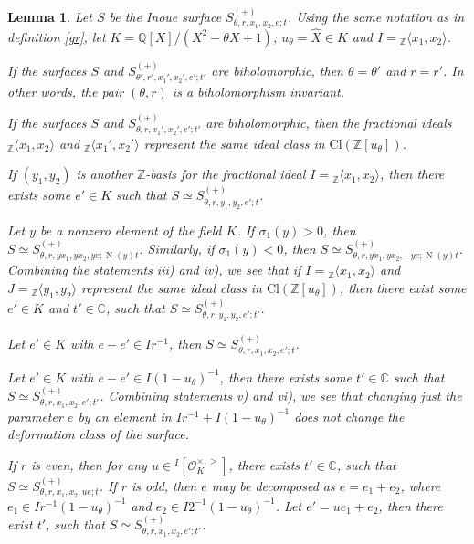 \documentclass[12pt]{amsart}
\newtheorem{lemma}{Lemma}[section]
\newcommand{\Z}{\mathbb{Z}}
\newcommand{\C}{\mathbb{C}}
\newcommand{\Q}{\mathbb{Q}}
\newcommand{\OO}{\mathcal{O}}
\DeclareMathOperator{\Norm}{N}
\begin{document}
\begin{lemma}\label{Sym}
Let $S$ be the Inoue surface $S_{\theta, r, x_1,x_2,e;t}^{(+)}$. Using the same notation as in definition \ref{gr}, let $K = \Q[X]/(X^2-\theta X + 1)$; $u_\theta = \hat{X} \in K$ and $I = {}_\Z\langle x_1, x_2\rangle$.
\begin{casenv}
\item If the surfaces $S$ and $S_{\theta',r',x_1',x_2',e';t'}^{(+)}$ are biholomorphic, then $\theta = \theta'$ and $r=r'$. In other words, the pair $(\theta,r)$ is a biholomorphism invariant.
\item If the surfaces $S$ and $S_{\theta,r,x_1',x_2',e';t'}^{(+)}$ are biholomorphic, then the fractional ideals $_\Z\langle x_1,x_2\rangle$ and $_\Z\langle x_1',x_2'\rangle$ represent the same ideal class in $\text{Cl}(\Z[u_\theta])$.
\item If $(y_1,y_2)$ is another $\Z$-basis for the fractional ideal $I={}_\Z\langle x_1,x_2\rangle$, then there exists some $e' \in K$ such that $S \simeq S_{\theta,r,y_1,y_2,e';t}^{(+)}$.
\item Let $y$ be a nonzero element of the field $K$. If $\sigma_1(y)>0$, then $S \simeq S_{\theta,r, yx_1,yx_2,ye;\Norm(y)t}^{(+)}$. Similarly, if $\sigma_1(y)<0$, then $S \simeq S_{\theta,r, yx_1,yx_2,-ye;\Norm(y)t}^{(+)}$. Combining the statements iii) and iv), we see that if $I={}_\Z\langle x_1,x_2\rangle$ and  $J={}_\Z\langle y_1,y_2\rangle$ represent the same ideal class in $\text{Cl}(\Z[u_\theta])$, then there exist some $e' \in K$ and $t' \in \C$, such that $S \simeq S_{\theta,r,y_1,y_2,e';t'}^{(+)}$.
\item Let $e' \in K$ with $e-e' \in Ir^{-1}$, then $S \simeq S^{(+)}_{\theta, r , x_1, x_2, e';t}$.
\item Let $e' \in K$ with $e-e' \in I(1-u_\theta)^{-1}$, then there exists some $t' \in \C$ such that $S \simeq S^{(+)}_{\theta, r, x_1, x_2, e';t'}$. Combining statements v) and vi), we see that changing just the parameter $e$ by an element in $Ir^{-1} + I(1-u_\theta)^{-1}$ does not change the deformation class of the surface.
\item If $r$ is even, then for any $u\in {}^I[\OO_K^{\times,>}]$, there exists $t' \in \C$, such that $S \simeq S^{(+)}_{\theta,r,x_1,x_2,ue;t}$. If $r$ is odd, then $e$ may be decomposed as $e=e_1 + e_2$, where $e_1 \in Ir^{-1}(1-u_\theta)^{-1}$ and $e_2 \in I2^{-1}(1-u_\theta)^{-1}$. Let $e' = ue_1 + e_2$, then there exist $t'$, such that $S \simeq S^{(+)}_{\theta, r, x_1,x_2,e';t'}$.
\end{casenv}
\end{lemma}
\end{document}

